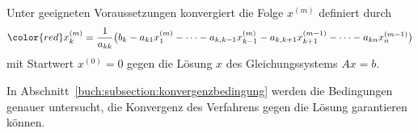 \begin{satz}
%
Unter geeigneten Voraussetzungen konvergiert die Folge $x^{(m)}$
definiert durch
\begin{equation}
{\color{red}x_k^{(m)}}
=
\frac{1}{a_{kk}}\bigl(
b_k  - a_{k1}x_1^{(m)} - \dots - a_{k,k-1}x_{k-1}^{(m)}
- a_{k,k+1}x_{k+1}^{(m-1)} - \dots - a_{kn}x_n^{(m-1)}
\bigr)
\label{buch:eqn:gs:iteration}
\end{equation}
mit Startwert $x^{(0)}=0$
gegen die Lösung $x$ des Gleichungssystems $Ax=b$.
\end{satz}

In Abschnitt~\ref{buch:subsection:konvergenzbedingung} werden die
Bedingungen genauer untersucht, die Konvergenz des Verfahrens gegen die
Lösung garantieren können.
%

